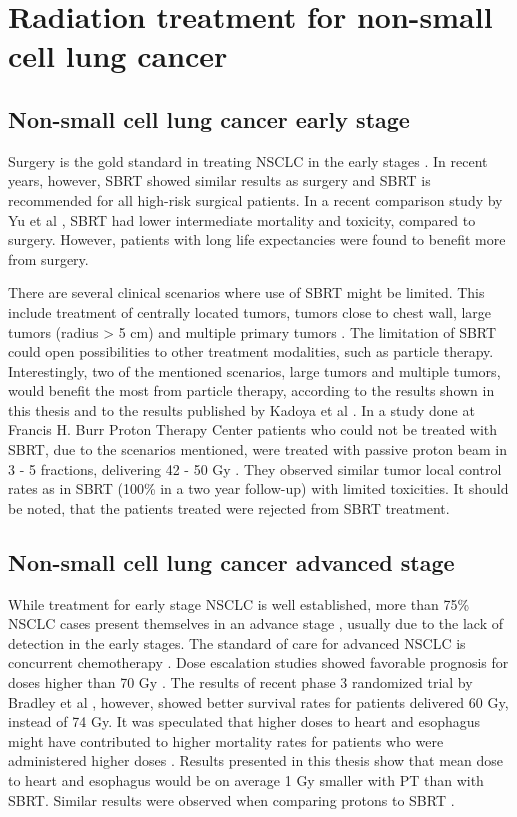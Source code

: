 \documentclass[type=dr, dr=rernat, accentcolor=tud7b,colorbacktitle, bigchapter, openright, twoside, 12pt ]{tudthesis}
\begin{document}
\newpage
\section{Radiation treatment for non-small cell lung cancer}

\subsection{Non-small cell lung cancer early stage}

Surgery is the gold standard in treating NSCLC in the early stages \cite{Roesch2014}. In recent years, however, SBRT showed similar results as surgery and SBRT is recommended for all high-risk surgical patients. In a recent comparison study by Yu et al \cite{Yu2015},
SBRT had lower intermediate mortality and toxicity, compared to surgery. However, patients with long life expectancies were found to benefit more from surgery. 

There are several clinical scenarios where use of SBRT might be limited. This include treatment of centrally located tumors, tumors close to chest wall, large tumors (radius > 5 cm) and multiple primary tumors \cite{Timmerman2006, Georg2008, Westover2012}.
The limitation of SBRT could open possibilities to other treatment modalities, such as particle therapy. Interestingly, two of the mentioned scenarios, large tumors and multiple tumors, would benefit the most from particle therapy, according to the results shown
in this thesis and to the results published by Kadoya et al \cite{Kadoya2010}. In a study done at Francis H. Burr Proton Therapy Center patients who could not be treated with SBRT, due to the scenarios mentioned, were treated with passive proton beam in 3 - 5 fractions, 
delivering 42 - 50 Gy \cite{Westover2012}. They observed similar tumor local control rates as in SBRT (100\% in a two year follow-up) with limited toxicities. It should be noted, that the patients treated were rejected from SBRT treatment.


\subsection{Non-small cell lung cancer advanced stage}

While treatment for early stage NSCLC is well established, more than 75\% NSCLC cases present themselves in an advance stage \cite{Jemal2009}, usually due to the lack of detection in the early stages. The standard of care for advanced NSCLC is concurrent chemotherapy \cite{Oshiro2014}.
Dose escalation studies showed favorable prognosis for doses higher than 70 Gy \cite{Hayman2001, Rosenman2002, Socinski2008}. The results of recent phase 3 randomized trial by Bradley et al \cite{Bradley2010}, however, showed better survival rates for patients delivered 60 Gy,
instead of 74 Gy. It was speculated that higher doses to heart and esophagus might have contributed to higher mortality rates for patients who were administered higher doses \cite{Cox2012}. Results presented in this thesis show that mean dose to heart and esophagus would be on average 1 Gy
smaller with PT than with SBRT. Similar results were observed when comparing protons to SBRT \cite{Georg2008}. 
\end{document}
